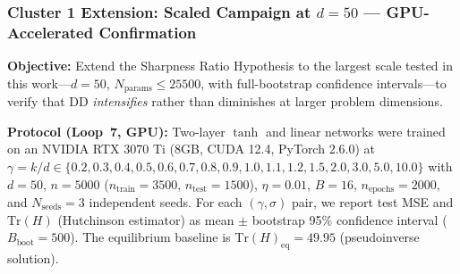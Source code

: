 \documentclass[
  journal=largetwo,
  simfonts=false,
  year=2025,
  volume=37,
]{cup-journal}
\begin{document}
\subsubsection{Cluster 1 Extension: Scaled Campaign at $d=50$ --- GPU-Accelerated Confirmation}\label{sec:d50_campaign}

\textbf{Objective:} Extend the Sharpness Ratio Hypothesis to the largest scale tested in this work---$d=50$, $N_{\mathrm{params}} \leq 25500$, with full-bootstrap confidence intervals---to verify that DD \emph{intensifies} rather than diminishes at larger problem dimensions.

\textbf{Protocol (Loop~7, GPU):} Two-layer $\tanh$ and linear networks were trained on an NVIDIA RTX 3070 Ti (8GB, CUDA 12.4, PyTorch 2.6.0) at $\gamma = k/d \in \{0.2, 0.3, 0.4, 0.5, 0.6, 0.7, 0.8, 0.9, 1.0, 1.1, 1.2, 1.5, 2.0, 3.0, 5.0, 10.0\}$ with $d=50$, $n=5000$ ($n_{\mathrm{train}}=3500$, $n_{\mathrm{test}}=1500$), $\eta=0.01$, $B=16$, $n_{\mathrm{epochs}}=2000$, and $N_{\mathrm{seeds}}=3$ independent seeds. For each $(\gamma, \sigma)$ pair, we report test MSE and $\mathrm{Tr}(H)$ (Hutchinson estimator) as mean $\pm$ bootstrap 95\% confidence interval ($B_{\mathrm{boot}}=500$). The equilibrium baseline is $\mathrm{Tr}(H)_{\mathrm{eq}} = 49.95$ (pseudoinverse solution).
\end{document}
